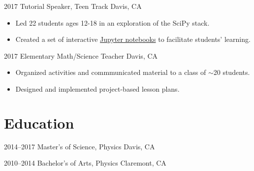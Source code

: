 \documentclass[]{cv-style}          %
\begin{document}
\begin{entrylist}

\entry
  {2017}
  {Tutorial Speaker, Teen Track}
  {Davis, CA}
  { 
  \begin{itemize}
    \item Led 22 students ages 12-18 in an exploration of the SciPy stack.
    \item Created a set of interactive \href{https://github.com/eqfinney/SciPy}{Jupyter notebooks} to facilitate students' learning.\\
  \end{itemize}}
\entry
  {2017}
  {Elementary Math/Science Teacher}
  {Davis, CA}
  { 
  \begin{itemize}
    \item Organized activities and commmunicated material to a class of $\sim$20 students.
    \item Designed and implemented project-based lesson plans.\\
  \end{itemize}}


\end{entrylist}


\section{Education}

\begin{entrylist}
\entry
{2014--2017}
{Master's of Science, Physics}
{Davis, CA}
{}

{\vspace{-0.2cm}}
\end{entrylist}
\begin{entrylist}
\entry
{2010--2014}
{Bachelor's of Arts, Physics}
{Claremont, CA}
{}
\end{entrylist}

\end{document}
